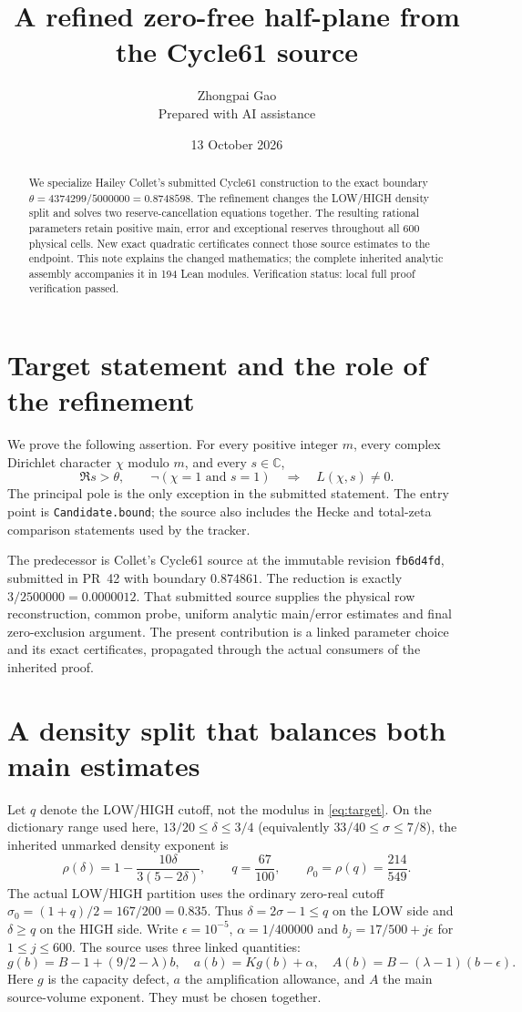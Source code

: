 \documentclass[10pt]{article}
\title{A refined zero-free half-plane from the Cycle61 source}
\author{Zhongpai Gao\\\small Prepared with AI assistance}
\date{13 October 2026}
\newcommand{\C}{\mathbb C}
\newcommand{\verificationstatus}{local full proof verification passed}
\begin{document}
\maketitle
\begin{abstract}
We specialize Hailey Collet's submitted Cycle61 construction to the exact
boundary $\theta=4374299/5000000=0.8748598$. The refinement changes the
LOW/HIGH density split and solves two reserve-cancellation equations together.
The resulting rational parameters retain positive main, error and exceptional
reserves throughout all 600 physical cells. New exact quadratic certificates
connect those source estimates to the endpoint. This note explains
the changed mathematics; the complete inherited analytic assembly accompanies
it in 194 Lean modules. Verification status: \verificationstatus.
\end{abstract}

\section{Target statement and the role of the refinement}
We prove the following assertion. For every positive
integer $m$, every complex Dirichlet character $\chi$ modulo $m$, and every
$s\in\C$,
\begin{equation}\label{eq:target}
 \Re s>\theta,\qquad \neg(\chi=1\text{ and }s=1)
 \quad\Longrightarrow\quad L(\chi,s)\ne0.
\end{equation}
The principal pole is the only exception in the submitted statement. The
entry point is \texttt{Candidate.bound}; the source also includes the Hecke
and total-zeta comparison statements used by the tracker.

The predecessor is Collet's Cycle61 source at the immutable revision
\texttt{fb6d4fd}, submitted in PR~42 with boundary $0.874861$.
The reduction is exactly $3/2500000=0.0000012$.
That submitted source supplies the physical row reconstruction, common probe,
uniform analytic main/error estimates and final zero-exclusion argument.
The present contribution is a linked parameter choice and its exact
certificates, propagated through the actual consumers of the inherited proof.

\section{A density split that balances both main estimates}
Let $q$ denote the LOW/HIGH cutoff, not the modulus in \eqref{eq:target}.
On the dictionary range used here, $13/20\le\delta\le3/4$
(equivalently $33/40\le\sigma\le7/8$), the inherited unmarked density exponent is
\[
 \rho(\delta)=1-\frac{10\delta}{3(5-2\delta)},\qquad
 q=\frac{67}{100},\qquad \rho_0=\rho(q)=\frac{214}{549}.
\]
The actual LOW/HIGH partition uses the ordinary zero-real cutoff
$\sigma_0=(1+q)/2=167/200=0.835$. Thus $\delta=2\sigma-1\le q$ on the LOW side
and $\delta\ge q$ on the HIGH side.
Write $\epsilon=10^{-5}$, $\alpha=1/400000$ and
$b_j=17/500+j\epsilon$ for $1\le j\le600$.
The source uses three linked quantities:
\[
 g(b)=B-1+(9/2-\lambda)b,\quad
 a(b)=K g(b)+\alpha,\quad
 A(b)=B-(\lambda-1)(b-\epsilon).
\]
Here $g$ is the capacity defect, $a$ the amplification allowance, and $A$ the
main source-volume exponent. They must be chosen together.
\end{document}
